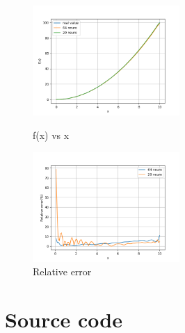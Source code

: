 \documentclass{beamer}
\begin{document}
    \begin{frame}
        \frametitle{\secname}

        \begin{figure}
        \begin{multicols}{2}
                \includegraphics[width=2.2in]{Figs/value.png}
                \caption{f(x) vs x}
                \columnbreak

                \includegraphics[width=2.2in]{Figs/error.png}
                \caption{Relative error}

            \end{multicols}
        \end{figure}
    \end{frame}

    \section{Source code}
\end{document}
